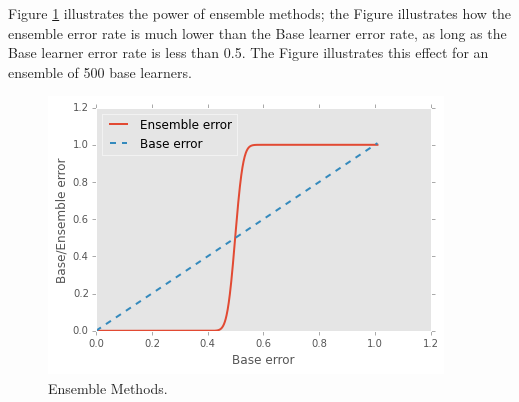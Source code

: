 \documentclass{article}
\begin{document}




Figure \ref{fig:ensemble} illustrates the power of ensemble methods; the Figure illustrates how the ensemble error rate is much lower than the Base learner error rate, as long as the Base learner error rate is less than 0.5. The Figure illustrates this effect for an ensemble of 500 base learners.








\begin{figure}[!ht]
 \caption{Ensemble Methods.}
  \label{fig:ensemble}
  \centering
    \includegraphics[scale=1.0]{ensemble}
\end{figure}
\end{document}
